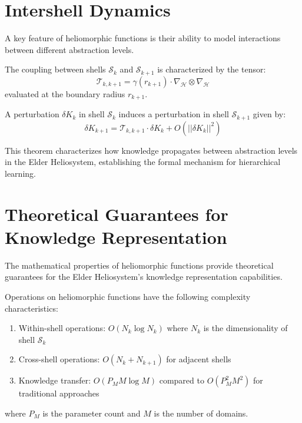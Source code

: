 \section{Intershell Dynamics}

A key feature of heliomorphic functions is their ability to model interactions between different abstraction levels.

\begin{definition}
The coupling between shells $\mathcal{S}_k$ and $\mathcal{S}_{k+1}$ is characterized by the tensor:
\begin{equation}
\mathcal{T}_{k,k+1} = \gamma(r_{k+1}) \cdot \nabla_{\mathcal{H}} \otimes \nabla_{\mathcal{H}}
\end{equation}
evaluated at the boundary radius $r_{k+1}$.
\end{definition}

\begin{theorem}
A perturbation $\delta K_k$ in shell $\mathcal{S}_k$ induces a perturbation in shell $\mathcal{S}_{k+1}$ given by:
\begin{equation}
\delta K_{k+1} = \mathcal{T}_{k,k+1} \cdot \delta K_k + O(||\delta K_k||^2)
\end{equation}
\end{theorem}

This theorem characterizes how knowledge propagates between abstraction levels in the Elder Heliosystem, establishing the formal mechanism for hierarchical learning.

\section{Theoretical Guarantees for Knowledge Representation}

The mathematical properties of heliomorphic functions provide theoretical guarantees for the Elder Heliosystem's knowledge representation capabilities.

\begin{theorem}
Operations on heliomorphic functions have the following complexity characteristics:
\begin{enumerate}
    \item Within-shell operations: $O(N_k \log N_k)$ where $N_k$ is the dimensionality of shell $\mathcal{S}_k$
    \item Cross-shell operations: $O(N_k + N_{k+1})$ for adjacent shells
    \item Knowledge transfer: $O(P_M M \log M)$ compared to $O(P_M^2 M^2)$ for traditional approaches
\end{enumerate}
where $P_M$ is the parameter count and $M$ is the number of domains.
\end{theorem}

